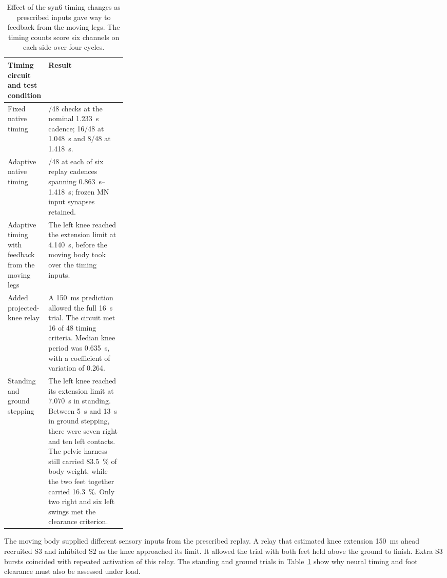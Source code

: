 \begin{table}
\centering
\caption[PF timing repairs and coupled-model limits]{Effect of the syn6 timing changes as prescribed inputs gave way to feedback from the moving legs. The timing counts score six channels on each side over four cycles.}
\label{tab:app_pf_progression}
\begin{tabularx}{\linewidth}{@{}>{\raggedright\arraybackslash}p{0.27\linewidth}>{\raggedright\arraybackslash}X@{}}
\toprule
Timing circuit and test condition & Result \\
\midrule
Fixed native timing & 48/48 checks at the nominal \qty{1.233}{\second} cadence; 16/48 at \qty{1.048}{\second} and 8/48 at \qty{1.418}{\second}. \\
Adaptive native timing & 48/48 at each of six replay cadences spanning \qtyrange{0.863}{1.418}{\second}; frozen MN input synapses retained. \\
Adaptive timing with feedback from the moving legs & The left knee reached the extension limit at \qty{4.140}{\second}, before the moving body took over the timing inputs. \\
Added projected-knee relay & A \qty{150}{\milli\second} prediction allowed the full \qty{16}{\second} trial. The circuit met 16 of 48 timing criteria. Median knee period was \qty{0.635}{\second}, with a coefficient of variation of 0.264. \\
Standing and ground stepping & The left knee reached its extension limit at \qty{7.070}{\second} in standing. Between \qty{5}{\second} and \qty{13}{\second} in ground stepping, there were seven right and ten left contacts. The pelvic harness still carried \qty{83.5}{\percent} of body weight, while the two feet together carried \qty{16.3}{\percent}. Only two right and six left swings met the clearance criterion. \\
\bottomrule
\end{tabularx}
\end{table}

The moving body supplied different sensory inputs from the prescribed replay. A relay that estimated knee extension \qty{150}{\milli\second} ahead recruited S3 and inhibited S2 as the knee approached its limit. It allowed the trial with both feet held above the ground to finish. Extra S3 bursts coincided with repeated activation of this relay. The standing and ground trials in Table~\ref{tab:app_pf_progression} show why neural timing and foot clearance must also be assessed under load.

